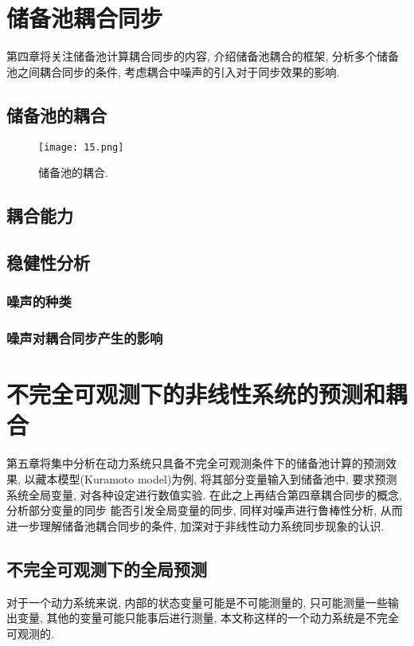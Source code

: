 \documentclass[notitlepage,cs4size,punct,oneside]{ctexrep}
\numberwithin{equation}{chapter}
\theoremstyle{mystyle}
\begin{document}
\chapter{储备池耦合同步}
第四章将关注储备池计算耦合同步的内容, 介绍储备池耦合的框架, 
分析多个储备池之间耦合同步的条件, 考虑耦合中噪声的引入对于同步效果的影响. 

\section{储备池的耦合}

\begin{figure}[htbp]
    \centering
    \texttt{[image: 15.png]}
    \caption{储备池的耦合.}
\end{figure}

\section{耦合能力}

\section{稳健性分析}

\subsection{噪声的种类}

\subsection{噪声对耦合同步产生的影响}


\chapter{不完全可观测下的非线性系统的预测和耦合}
第五章将集中分析在动力系统只具备不完全可观测条件下的储备池计算的预测效果, 
以藏本模型(Kuramoto model)为例, 将其部分变量输入到储备池中, 要求预测系统全局变量, 
对各种设定进行数值实验. 在此之上再结合第四章耦合同步的概念, 分析部分变量的同步
能否引发全局变量的同步, 同样对噪声进行鲁棒性分析, 从而进一步理解储备池耦合同步的条件, 
加深对于非线性动力系统同步现象的认识. 

\section{不完全可观测下的全局预测}
对于一个动力系统来说, 内部的状态变量可能是不可能测量的, 只可能测量一些输出变量, 
其他的变量可能只能事后进行测量, 本文称这样的一个动力系统是不完全可观测的. 
\end{document}
